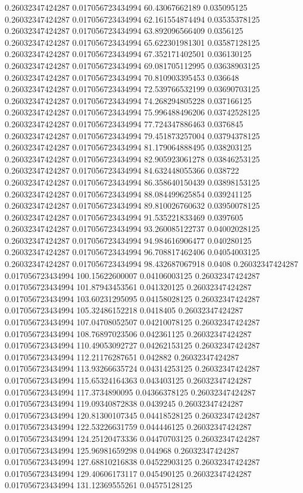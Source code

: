 0.26032347424287 0.017056723434994 60.43067662189 0.035095125
0.26032347424287 0.017056723434994 62.161554874494 0.03535378125
0.26032347424287 0.017056723434994 63.892096566409 0.0356125
0.26032347424287 0.017056723434994 65.622301981301 0.03587128125
0.26032347424287 0.017056723434994 67.352171402501 0.036130125
0.26032347424287 0.017056723434994 69.081705112995 0.03638903125
0.26032347424287 0.017056723434994 70.810903395453 0.036648
0.26032347424287 0.017056723434994 72.539766532199 0.03690703125
0.26032347424287 0.017056723434994 74.268294805228 0.037166125
0.26032347424287 0.017056723434994 75.996488496206 0.03742528125
0.26032347424287 0.017056723434994 77.724347886463 0.0376845
0.26032347424287 0.017056723434994 79.451873257004 0.03794378125
0.26032347424287 0.017056723434994 81.179064888495 0.038203125
0.26032347424287 0.017056723434994 82.905923061278 0.03846253125
0.26032347424287 0.017056723434994 84.632448055366 0.038722
0.26032347424287 0.017056723434994 86.358640150439 0.03898153125
0.26032347424287 0.017056723434994 88.084499625854 0.039241125
0.26032347424287 0.017056723434994 89.810026760632 0.03950078125
0.26032347424287 0.017056723434994 91.535221833469 0.0397605
0.26032347424287 0.017056723434994 93.260085122737 0.04002028125
0.26032347424287 0.017056723434994 94.984616906477 0.040280125
0.26032347424287 0.017056723434994 96.708817462406 0.04054003125
0.26032347424287 0.017056723434994 98.432687067918 0.0408
0.26032347424287 0.017056723434994 100.15622600007 0.04106003125
0.26032347424287 0.017056723434994 101.87943453561 0.041320125
0.26032347424287 0.017056723434994 103.60231295095 0.04158028125
0.26032347424287 0.017056723434994 105.32486152218 0.0418405
0.26032347424287 0.017056723434994 107.04708052507 0.04210078125
0.26032347424287 0.017056723434994 108.76897023506 0.042361125
0.26032347424287 0.017056723434994 110.49053092727 0.04262153125
0.26032347424287 0.017056723434994 112.21176287651 0.042882
0.26032347424287 0.017056723434994 113.93266635724 0.04314253125
0.26032347424287 0.017056723434994 115.65324164363 0.043403125
0.26032347424287 0.017056723434994 117.3734890095 0.04366378125
0.26032347424287 0.017056723434994 119.09340872838 0.0439245
0.26032347424287 0.017056723434994 120.81300107345 0.04418528125
0.26032347424287 0.017056723434994 122.53226631759 0.044446125
0.26032347424287 0.017056723434994 124.25120473336 0.04470703125
0.26032347424287 0.017056723434994 125.96981659298 0.044968
0.26032347424287 0.017056723434994 127.68810216838 0.04522903125
0.26032347424287 0.017056723434994 129.40606173117 0.045490125
0.26032347424287 0.017056723434994 131.12369555261 0.04575128125

